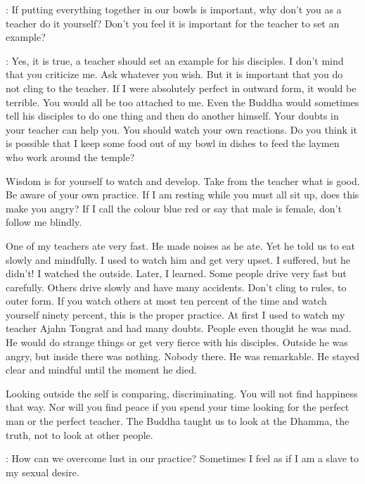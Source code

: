 :
If putting everything together in our bowls is important, why don't you as a teacher do it yourself? Don't you feel it is important for the teacher to set an example? 

: Yes, it is true, a teacher should set an example for his disciples. I don't mind that you criticize me. Ask whatever you wish. But it is important that you do not cling to the teacher. If I were absolutely perfect in outward form, it would be terrible. You would all be too attached to me. Even the Buddha would sometimes tell his disciples to do one thing and then do another himself. Your doubts in your teacher can help you. You should watch your own reactions. Do you think it is possible that I keep some food out of my bowl in dishes to feed the laymen who work around the temple? 

Wisdom is for yourself to watch and develop. Take from the teacher what is good. Be aware of your own practice. If I am resting while you must all sit up, does this make you angry? If I call the colour blue red or say that male is female, don't follow me blindly. 

One of my teachers ate very fast. He made noises as he ate. Yet he told us to eat slowly and mindfully. I used to watch him and get very upset. I suffered, but he didn't! I watched the outside. Later, I learned. Some people drive very fast but carefully. Others drive slowly and have many accidents. Don't cling to rules, to outer form. If you watch others at most ten percent of the time and watch yourself ninety percent, this is the proper practice. At first I used to watch my teacher Ajahn Tongrat and had many doubts. People even thought he was mad. He would do strange things or get very fierce with his disciples. Outside he was angry, but inside there was nothing. Nobody there. He was remarkable. He stayed clear and mindful until the moment he died. 

Looking outside the self is comparing, discriminating. You will not find happiness that way. Nor will you find peace if you spend your time looking for the perfect man or the perfect teacher. The Buddha taught us to look at the Dhamma, the truth, not to look at other people. 

:
How can we overcome lust in our practice? Sometimes I feel as if I am a slave to my sexual desire. 

